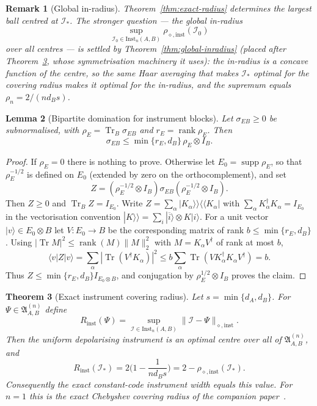 \documentclass[11pt,a4paper]{article}
\newtheorem{theorem}{Theorem}[section]
\newtheorem{lemma}[theorem]{Lemma}
\newtheorem{remark}[theorem]{Remark}
\newcommand{\Inst}{\mathrm{Inst}}
\newcommand{\Tr}{\operatorname{Tr}}
\newcommand{\supp}{\operatorname{supp}}
\newcommand{\rank}{\operatorname{rank}}
\begin{document}
\begin{remark}[Global in-radius]
\label{rem:global-inradius}
Theorem~\ref{thm:exact-radius} determines the largest ball centred at $\mathcal I_*$. The stronger question --- the global in-radius
\[
\sup_{\mathcal I_0\in\Inst_n(A,B)}\rho_{\diamond,\mathrm{inst}}(\mathcal I_0)
\]
over all centres --- is settled by Theorem~\ref{thm:global-inradius} (placed after Theorem~\ref{thm:covering}, whose symmetrisation machinery it uses): the in-radius is a concave function of the centre, so the same Haar averaging that makes $\mathcal I_*$ optimal for the covering radius makes it optimal for the in-radius, and the supremum equals $\rho_n=2/(nd_Bs)$.
\end{remark}

\begin{lemma}[Bipartite domination for instrument blocks]
\label{lem:domination}
Let $\sigma_{EB}\ge0$ be subnormalised, with $\rho_E=\Tr_B\sigma_{EB}$ and $r_E=\rank\rho_E$. Then
\[
\sigma_{EB}\le\min\{r_E,d_B\}\,\rho_E\otimes I_B.
\]
\end{lemma}

\begin{proof}
If $\rho_E=0$ there is nothing to prove. Otherwise let $E_0=\supp\rho_E$, so that $\rho_E^{-1/2}$ is defined on $E_0$ (extended by zero on the orthocomplement), and set
\[
Z=(\rho_E^{-1/2}\otimes I_B)\sigma_{EB}(\rho_E^{-1/2}\otimes I_B).
\]
Then $Z\ge0$ and $\Tr_BZ=I_{E_0}$. Write $Z=\sum_\alpha|K_\alpha\rangle\!\rangle\langle\!\langle K_\alpha|$ with $\sum_\alpha K_\alpha^\dagger K_\alpha=I_{E_0}$ in the vectorisation convention $|K\rangle\!\rangle=\sum_i|\overline i\rangle\otimes K|i\rangle$. For a unit vector $|v\rangle\in E_0\otimes B$ let $V:E_0\to B$ be the corresponding matrix of rank $b\le\min\{r_E,d_B\}$. Using $|\Tr M|^2\le\rank(M)\|M\|_2^2$ with $M=K_\alpha V^\dagger$ of rank at most $b$,
\[
\langle v|Z|v\rangle
=\sum_\alpha|\Tr(V^\dagger K_\alpha)|^2
\le b\sum_\alpha\Tr(VK_\alpha^\dagger K_\alpha V^\dagger)=b.
\]
Thus $Z\le\min\{r_E,d_B\}I_{E_0\otimes B}$, and conjugation by $\rho_E^{1/2}\otimes I_B$ proves the claim.
\end{proof}

\begin{theorem}[Exact instrument covering radius]
\label{thm:covering}
Let $s=\min\{d_A,d_B\}$. For $\Psi\in\mathfrak A_{A,B}^{(n)}$ define
\[
R_{\mathrm{inst}}(\Psi)=\sup_{\mathcal I\in\Inst_n(A,B)}\|\mathcal I-\Psi\|_{\diamond,\mathrm{inst}}.
\]
Then the uniform depolarising instrument is an optimal centre over all of $\mathfrak A_{A,B}^{(n)}$, and
\[
R_{\mathrm{inst}}(\mathcal I_*)=2\Big(1-\frac1{nd_Bs}\Big)=2-\rho_{\diamond,\mathrm{inst}}(\mathcal I_*).
\]
Consequently the exact constant-code instrument width equals this value. For $n=1$ this is the exact Chebyshev covering radius of the companion paper~\cite{CompanionChannels}.
\end{theorem}
\end{document}
